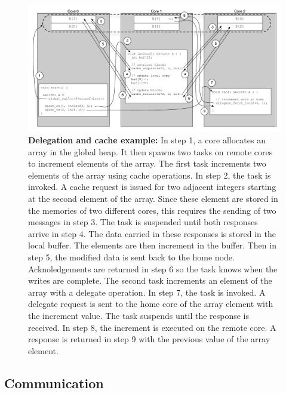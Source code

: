 \begin{figure}[htb]
\begin{center}
  \includegraphics[width=6in]{figs/delegate-cache}
\begin{minipage}{\columnwidth}

\caption{\label{fig:delegate-cache} \textbf{Delegation and cache example:} In step 1, a core allocates an array in the global heap. It then spawns two tasks on remote cores to increment elements of the array.  The first task increments two elements of the array using cache operations. In step 2, the task is invoked. A cache request is issued for two adjacent integers starting at the second element of the array. Since these element are stored in the memories of two different cores, this requires the sending of two messages in step 3. The task is suspended until both responses arrive in step 4. The data carried in these responses is stored in the local buffer. The elements are then increment in the buffer. Then in step 5, the modified data is sent back to the home node. Acknoledgements are returned in step 6 so the task knows when the writes are complete. The second task increments an element of the array with a delegate operation. In step 7, the task is invoked. A delegate request is sent to the home core of the array element with the increment value. The task suspends until the response is received. In step 8, the increment is executed on the remote core. A response is returned in step 9 with the previous value of the array element. }

\end{minipage}
\vspace{-3ex}
\end{center}
\end{figure}

\subsection{Communication}\label{sec:communication}

